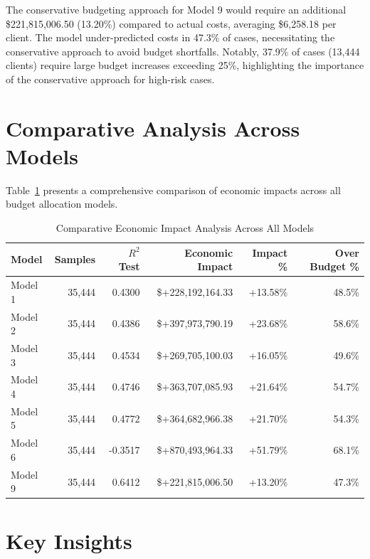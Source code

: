 The conservative budgeting approach for Model 9 would require an additional \$221,815,006.50 (13.20\%) compared to actual costs, averaging \$6,258.18 per client. The model under-predicted costs in 47.3\% of cases, necessitating the conservative approach to avoid budget shortfalls. Notably, 37.9\% of cases (13,444 clients) require large budget increases exceeding 25\%, highlighting the importance of the conservative approach for high-risk cases. 

\clearpage

\section{Comparative Analysis Across Models }
\label{subsec:comparative_impact}

Table~\ref{tab:all_models_impact_comparison} presents a comprehensive comparison of economic impacts across all budget allocation models.

\begin{table}[htbp]
\centering
\small
\caption{Comparative Economic Impact Analysis Across All Models \FiscalYear}
\label{tab:all_models_impact_comparison}
\begin{tabular}{lrrrrr}
\toprule
\textbf{Model} & \textbf{Samples} & \textbf{$R^2$ Test} & \textbf{Economic Impact} & \textbf{Impact \%} & \textbf{Over Budget \%} \\
\midrule
Model 1 & 35,444 & 0.4300 & \$+228,192,164.33 & +13.58\% & 48.5\% \\
Model 2 & 35,444 & 0.4386 & \$+397,973,790.19 & +23.68\% & 58.6\% \\
Model 3 & 35,444 & 0.4534 & \$+269,705,100.03 & +16.05\% & 49.6\% \\
Model 4 & 35,444 & 0.4746 & \$+363,707,085.93 & +21.64\% & 54.7\% \\
Model 5 & 35,444 & 0.4772 & \$+364,682,966.38 & +21.70\% & 54.3\% \\
Model 6 & 35,444 & -0.3517 & \$+870,493,964.33 & +51.79\% & 68.1\% \\
Model 9 & 35,444 & 0.6412 & \$+221,815,006.50 & +13.20\% & 47.3\% \\
\bottomrule
\end{tabular}
\end{table}

\section{Key Insights}


